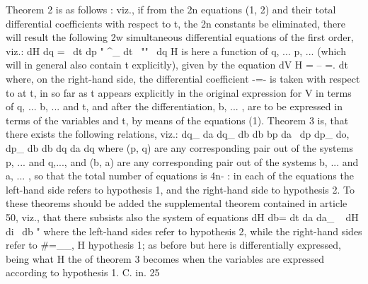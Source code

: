 \documentclass[12pt,a4paper]{article}
\theoremstyle{definition}
\begin{document}
Theorem 2 is as follows : viz., if from the 2n equations (1, 2) and their total
differential coefficients with respect to t, the 2n constants be eliminated, there will result
the following 2w simultaneous differential equations of the first order, viz.:
dH
dq =~
dt dp "
^_
dt~ ""
~dq
H
is here a function of q, ... p, ... (which will in general also contain t explicitly),
given by the equation
dV
H = -- =.
dt
where, on the right-hand side, the differential coefficient -=- is taken with respect to
at
t, in so far as t appears explicitly in the original expression for V in terms of
q, ... b, ... and t, and after the differentiation, b, ... , are to be expressed in terms of
the variables and t, by means of the equations (1).
Theorem 3 is, that there exists the following relations, viz.:
dq_ da dq_ db
db bp da~ dp
dp_ do, dp_ db
db dq da dq
where (p, q) are any corresponding pair out of the systems p, ... and q,..., and (b, a)
are any corresponding pair out of the systems b, ... and a, ... , so that the total
number of equations is 4n- : in each of the equations the left-hand side refers to
hypothesis 1, and the right-hand side to hypothesis 2.
To these theorems should be added the supplemental theorem contained in
article 50, viz., that there subsists also the system of equations
dH
db=
dt da
da_
~
dH
di~ db "
where the left-hand sides refer to hypothesis 2, while the right-hand sides refer to
#=__, H
hypothesis 1; as before but here is differentially expressed, being what
H
the of theorem 3 becomes when the variables are expressed according to hypothesis 1.
C. in. 25


\end{document}
